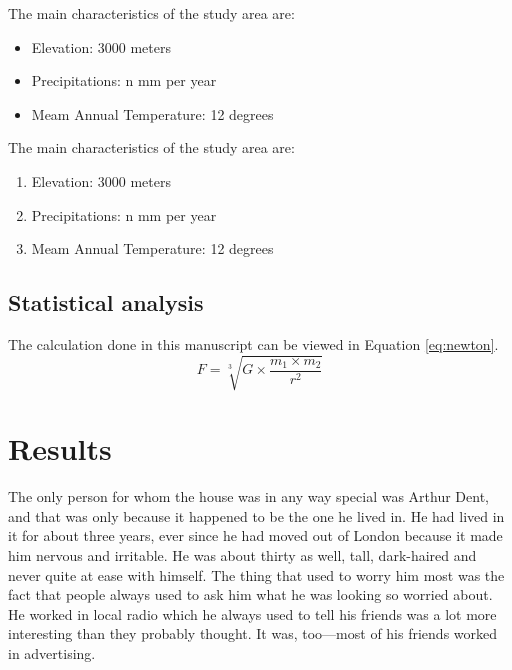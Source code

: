 \documentclass[a4paper, 12pt]{article}
\begin{document}
\noindent The main characteristics of the study area are:
\begin{itemize}
    \item Elevation: 3000 meters
    \item Precipitations: n mm per year
    \item Meam Annual Temperature: 12 degrees
\end{itemize}

\noindent The main characteristics of the study area are:
\begin{enumerate}
    \item Elevation: 3000 meters
    \item Precipitations: n mm per year
    \item Meam Annual Temperature: 12 degrees
\end{enumerate}

\subsection{Statistical analysis} %
The calculation done in this manuscript can be viewed in Equation \ref{eq:newton}.
\begin{equation}
    F = \sqrt[3]{G \times \frac{m_1 \times m_2}{r^2}}
    \label{eq:newton} %
\end{equation}


\section{Results}

The only person for whom the house was in any way special was Arthur Dent, and that was only because it happened to be the one he lived in. He had lived in it for about three years, ever since he had moved out of London because it made him nervous and irritable. He was about thirty as well, tall, dark-haired and never quite at ease with himself. The thing that used to worry him most was the fact that people always used to ask him what he was looking so worried about. He worked in local radio which he always used to tell his friends was a lot more interesting than they probably thought. It was, too—most of his friends worked in advertising.
\end{document}
